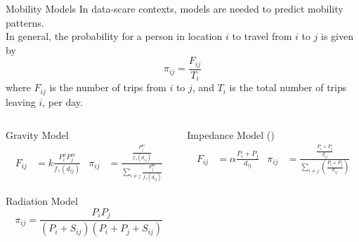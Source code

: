 \begin{slide}{Mobility Models}
In data-scare contexts, models are needed to predict mobility patterns. \\

In general, the probability for a person in location $i$ to travel from $i$ to $j$ is given by
$$\pi_{ij} = \frac{F_{ij}}{T_i}$$
where $F_{ij}$ is the number of trips from $i$ to $j$, and $T_i$ is the total number of trips leaving $i$, per day.

\begin{columns}[T]
	\begin{column}{.4\textwidth}
		\begin{block}{Gravity Model} %
			\begin{align*}
				F_{ij} &= k \frac{P_i^n P_j^m}{f_{\gamma} (d_{ij})} &
				\pi_{ij} &= \frac{\frac{P_j^m}{f_\gamma (d_{ij})}}{\sum_{i \neq j} \frac{P_j^m}{f_\gamma (d_{ij})}}
			\end{align*}
		\end{block}
		
		\begin{block}{Radiation Model} %
			$$\pi_{ij} = \frac{P_i P_j}{(P_i + S_{ij})(P_i + P_j + S_{ij})}$$
		\end{block}
	\end{column}
	
	\begin{column}{.4\textwidth}
		\vspace{.25in}
		\begin{block}{Impedance Model (\cite{Sallah2017MathematicalMF})}
			\begin{align*}
				F_{ij} &= \alpha \frac{P_i + P_j}{d_{ij}} &
				\pi_{ij} &= \frac{\frac{P_i + P_j}{d_{ij}}}{\sum_{i \neq j} \left( \frac{P_i + P_j}{d_{ij}} \right)}
			\end{align*}
		\end{block}
	\end{column}
\end{columns}

\end{slide}